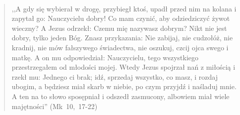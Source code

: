 \documentclass[10pt,a4paper,oneside]{article}
\begin{document}
\paragraph{}
\begin{quote}
,,A gdy się wybierał w drogę, przybiegł ktoś, upadł przed nim na kolana i zapytał go: Nauczycielu dobry! Co mam czynić, aby odziedziczyć żywot wieczny? A Jezus odrzekł: Czemu mię nazywasz dobrym? Nikt nie jest dobry, tylko jeden Bóg. Znasz przykazania: Nie zabijaj, nie cudzołóż, nie kradnij, nie mów fałszywego świadectwa, nie oszukuj, czcij ojca swego i matkę. A on mu odpowiedział: Nauczycielu, tego wszystkiego przestrzegałem od młodości mojej. Wtedy Jezus spojrzał nań z miłością i rzekł mu: Jednego ci brak; idź, sprzedaj wszystko, co masz, i rozdaj ubogim, a będziesz miał skarb w niebie, po czym przyjdź i naśladuj mnie. A ten na to słowo sposępniał i odszedł zasmucony, albowiem miał wiele majętności'' \mbox{(Mk 10, 17-22)}
\end{quote}
\end{document}
